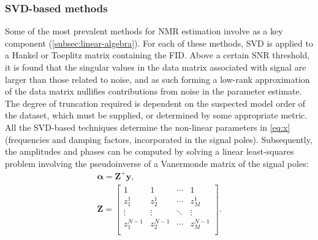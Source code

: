 \subsubsection{\acs{SVD}-based methods}
Some of the most prevalent methods for \ac{NMR} estimation involve 
as a key component (\cref{subsec:linear-algebra}). For each of these methods,
\ac{SVD} is applied to a Hankel or Toeplitz matrix containing the \ac{FID}.
Above a certain \ac{SNR} threshold, it is found that the singular values in the
data matrix associated with signal are larger than those related to noise, and
as such forming a low-rank approximation of the data matrix nullifies
contributions from noise in the parameter estimate. The degree of truncation
required is dependent on the suspected model order of the dataset, which must
be supplied, or determined by some appropriate metric. All the \ac{SVD}-based
techniques determine the non-linear parameters in \cref{eq:x} (frequencies and
damping factors, incorporated in the signal poles).  Subsequently, the
amplitudes and phases can be computed by solving a linear least-squares
problem involving the pseudoinverse of a Vanermonde matrix of the signal poles:
\begin{subequations}
    \begin{gather}
        \symbf{\alpha} = \symbf{Z}^+ \symbf{y},\\
        \symbf{Z} = \begin{bmatrix}
            1 & 1 & \cdots & 1 \\
            z_1^1 & z_2^1 & \cdots & z_M^1\\
            \vdots & \vdots & \ddots & \vdots\\
            z_1^{N-1} & z_2^{N-1} & \cdots & z_M^{N-1}\\
            \end{bmatrix}.
    \end{gather}
    \label{eq:complex-amplitudes}
\end{subequations}

